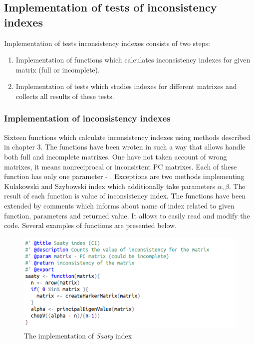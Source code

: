 \subsection{Implementation of tests of inconsistency indexes}
Implementation of tests inconsistency indexes consists of two steps:
\begin{enumerate}
  \item Implementation of functions which calculates inconsistency indexes for given matrix (full or incomplete).
  \item Implementation of tests which studies indexes for different matrixes and collects all results of these tests. 
\end{enumerate}

\subsubsection{Implementation of inconsistency indexes}
Sixteen functions which calculate inconsistency indexes using methods described in chapter 3. The functions have been wroten in such a way that allows handle both full and incomplete matrixes. One have not taken account of wrong matrixes, it means nonreciprocal or inconsistent PC matrixes. Each of these function has only one parameter - . Exceptions are two methods implementing Kulakowski and Szybowski index which additionally take parameters $\alpha, \beta$. The result of each function is value of inconsistency index. The functions have been extended by comments which informs about name of index related to given function, parameters and returned value. It allows to easily read and modify the code. Several examples of functions are presented below.

\begin{figure}[h]
\centerline{\includegraphics[scale=0.75]{images/kod1.png}}
\caption{The implementation of \textit{Saaty} index}
\label{fig:rstudio}
\end{figure}


